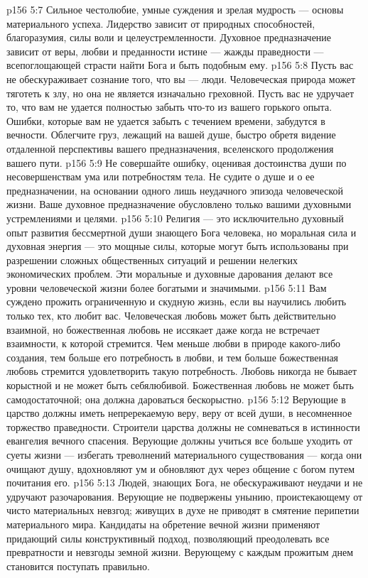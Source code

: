 \vs p156 5:7 Сильное честолюбие, умные суждения и зрелая мудрость --- основы материального успеха. Лидерство зависит от природных способностей, благоразумия, силы воли и целеустремленности. Духовное предназначение зависит от веры, любви и преданности истине --- жажды праведности --- всепоглощающей страсти найти Бога и быть подобным ему.
\vs p156 5:8 Пусть вас не обескураживает сознание того, что вы --- люди. Человеческая природа может тяготеть к злу, но она не является изначально греховной. Пусть вас не удручает то, что вам не удается полностью забыть что\hyp{}то из вашего горького опыта. Ошибки, которые вам не удается забыть с течением времени, забудутся в вечности. Облегчите груз, лежащий на вашей душе, быстро обретя видение отдаленной перспективы вашего предназначения, вселенского продолжения вашего пути.
\vs p156 5:9 Не совершайте ошибку, оценивая достоинства души по несовершенствам ума или потребностям тела. Не судите о душе и о ее предназначении, на основании одного лишь неудачного эпизода человеческой жизни. Ваше духовное предназначение обусловлено только вашими духовными устремлениями и целями.
\vs p156 5:10 Религия --- это исключительно духовный опыт развития бессмертной души знающего Бога человека, но моральная сила и духовная энергия --- это мощные силы, которые могут быть использованы при разрешении сложных общественных ситуаций и решении нелегких экономических проблем. Эти моральные и духовные дарования делают все уровни человеческой жизни более богатыми и значимыми.
\vs p156 5:11 Вам суждено прожить ограниченную и скудную жизнь, если вы научились любить только тех, кто любит вас. Человеческая любовь может быть действительно взаимной, но божественная любовь не иссякает даже когда не встречает взаимности, к которой стремится. Чем меньше любви в природе какого\hyp{}либо создания, тем больше его потребность в любви, и тем больше божественная любовь стремится удовлетворить такую потребность. Любовь никогда не бывает корыстной и не может быть себялюбивой. Божественная любовь не может быть самодостаточной; она должна дароваться бескорыстно.
\vs p156 5:12 Верующие в царство должны иметь непререкаемую веру, веру от всей души, в несомненное торжество праведности. Строители царства должны не сомневаться в истинности евангелия вечного спасения. Верующие должны учиться все больше уходить от суеты жизни --- избегать треволнений материального существования --- когда они очищают душу, вдохновляют ум и обновляют дух через общение с богом путем почитания его.
\vs p156 5:13 Людей, знающих Бога, не обескураживают неудачи и не удручают разочарования. Верующие не подвержены унынию, проистекающему от чисто материальных невзгод; живущих в духе не приводят в смятение перипетии материального мира. Кандидаты на обретение вечной жизни применяют придающий силы конструктивный подход, позволяющий преодолевать все превратности и невзгоды земной жизни. Верующему с каждым прожитым днем становится  поступать правильно.

